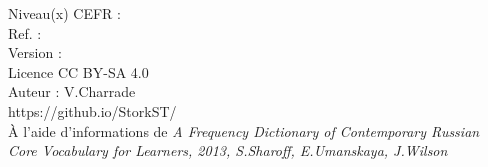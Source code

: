 \fontsize{5}{5}
\selectfont

\vspace{\baselineskip}
Niveau(x) CEFR : \level \\
Ref. :  \\
Version : \version \\
Licence CC BY-SA 4.0\\

\noindent Auteur : V.Charrade\\
https://github.io/StorkST/\\
À l'aide d'informations de \textit{A Frequency Dictionary of Contemporary Russian Core Vocabulary for Learners, 2013, S.Sharoff, E.Umanskaya, J.Wilson}
